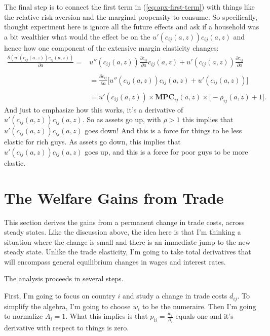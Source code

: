 \documentclass[12pt,pdftex]{article}
\begin{document}
\begin{onehalfspacing}
The final step is to connect the first term in (\ref{eq:apx-first-term}) with things like the relative risk aversion and the marginal propensity to consume. So specifically, thought experiment here is ignore all the future effects and ask if a household was a bit wealthier what would the effect be on the $u'(c_{ij}(a,z))c_{ij}(a,z)$ and hence how one component of the extensive margin elasticity changes:
\begin{align}
\frac{\partial (u'(c_{ij}(a,z))c_{ij}(a,z))}{\partial a} =& u''(c_{ij}(a,z))\frac{\partial c_{ij}}{\partial a}c_{ij}(a,z) + u'(c_{ij}(a,z))\frac{\partial c_{ij}}{\partial a} \\
\nonumber \\
&= \frac{\partial c_{ij}}{\partial a}\bigg[u''(c_{ij}(a,z))c_{ij}(a,z) + u'(c_{ij}(a,z)) \bigg] \\
\nonumber\\
&= u'(c_{ij}(a,z))\times \mathbf{MPC}_{ij}(a,z) \times \bigg[-\rho_{ij}(a,z) + 1\bigg]. \label{eq:apx-elasticity-mpc}
\end{align}
And just to emphasize how this works, it's a derivative of $u'(c_{ij}(a,z))c_{ij}(a,z)$. So as assets go up, with $\rho > 1$ this implies that $u'(c_{ij}(a,z))c_{ij}(a,z)$ goes down! And this is a force for things to be less elastic for rich guys. As assets go down, this implies that $u'(c_{ij}(a,z))c_{ij}(a,z)$ goes up, and this is a force for poor guys to be more elastic.

\section{The Welfare Gains from Trade}\label{apx-sec:gains-trade}

This section derives the gains from a permanent change in trade costs, across steady states. Like the discussion above, the idea here is that I'm thinking a situation where the change is small and there is an immediate jump to the new steady state. Unlike the trade elasticity, I'm going to take total derivatives that will encompass general equilibrium changes in wages and interest rates.

The analysis proceeds in several steps.

First, I'm going to focus on country $i$ and study a change in trade costs $d_{ij}$. To simplify the algebra, I'm going to choose $w_i$ to be the numeraire. Then I'm going to normalize $A_i = 1$. What this implies is that $p_{ii} = \frac{w_i}{A_i}$ equals one and it's derivative with respect to things is zero.


\end{onehalfspacing}
\end{document}
